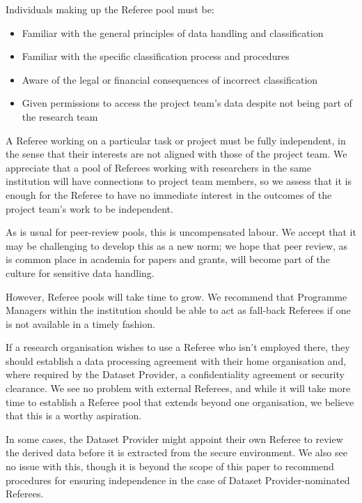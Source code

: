 \documentclass[10pt,a4paper,twocolumn]{article}
\begin{document}
Individuals making up the Referee pool must be:

\begin{itemize}
    \item Familiar with the general principles of data handling and classification
    \item Familiar with the specific classification process and procedures
    \item Aware of the legal or financial consequences of incorrect classification
    \item Given permissions to access the project team’s data despite not being part of the research team
\end{itemize}

A Referee working on a particular task or project must be fully independent, in the sense that their interests are not aligned with those of the project team. We appreciate that a pool of Referees working with researchers in the same institution will have connections to project team members, so we assess that it is enough for the Referee to have no immediate interest in the outcomes of the project team’s work to be independent. 

As is usual for peer-review pools, this is uncompensated labour. We accept that it may be challenging to develop this as a new norm; we hope that peer review, as is common place in academia for papers and grants, will become part of the culture for sensitive data handling. 

However, Referee pools will take time to grow. We recommend that Programme Managers within the institution should be able to act as fall-back Referees if one is not available in a timely fashion.

If a research organisation wishes to use a Referee who isn’t employed there, they should establish a data processing agreement with their home organisation and, where required by the Dataset Provider, a confidentiality agreement or security clearance. We see no problem with external Referees, and while it will take more time to establish a Referee pool that extends beyond one organisation, we believe that this is a worthy aspiration.

In some cases, the Dataset Provider might appoint their own Referee to review the derived data before it is extracted from the secure environment. We also see no issue with this, though it is beyond the scope of this paper to recommend procedures for ensuring independence in the case of Dataset Provider-nominated Referees.
\end{document}
